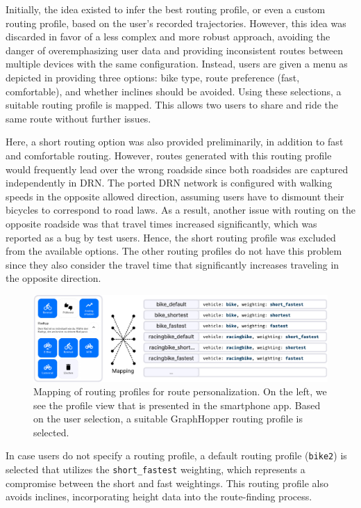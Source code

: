 Initially, the idea existed to infer the best routing profile, or even a custom routing profile, based on the user's recorded trajectories. However, this idea was discarded in favor of a less complex and more robust approach, avoiding the danger of overemphasizing user data and providing inconsistent routes between multiple devices with the same configuration. Instead, users are given a menu as depicted in  providing three options: bike type, route preference (fast, comfortable), and whether inclines should be avoided. Using these selections, a suitable routing profile is mapped. This allows two users to share and ride the same route without further issues.

Here, a short routing option was also provided preliminarily, in addition to fast and comfortable routing. However, routes generated with this routing profile would frequently lead over the wrong roadside since both roadsides are captured independently in DRN. The ported DRN network is configured with walking speeds in the opposite allowed direction, assuming users have to dismount their bicycles to correspond to road laws. As a result, another issue with routing on the opposite roadside was that travel times increased significantly, which was reported as a bug by test users. Hence, the short routing profile was excluded from the available options. The other routing profiles do not have this problem since they also consider the travel time that significantly increases traveling in the opposite direction.

\begin{figure}[t]
\centering
\includegraphics[width=\linewidth]{images/routing-profile-mapping.pdf}
\caption{Mapping of routing profiles for route personalization. On the left, we see the profile view that is presented in the smartphone app. Based on the user selection, a suitable GraphHopper routing profile is selected.}
\label{fig:routing-profile-mapping}
\end{figure}

In case users do not specify a routing profile, a default routing profile (\texttt{bike2}) is selected that utilizes the \texttt{short\_fastest} weighting, which represents a compromise between the short and fast weightings. This routing profile also avoids inclines, incorporating height data into the route-finding process.

